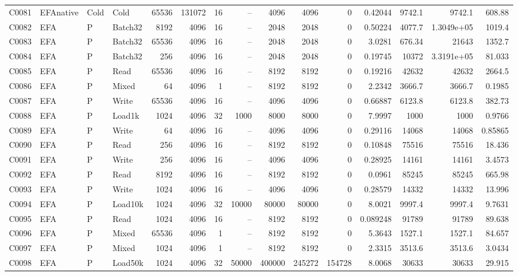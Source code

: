 \begin{landscape}
\begin{longtable}{llllrrrrrrrrrrr}
C0081 & EFAnative & Cold & Cold & 65536 & 131072 & 16 & -- & 4096 & 4096 & 0 & 0.42044 & 9742.1 & 9742.1 & 608.88\\
C0082 & EFA & P & Batch32 & 8192 & 4096 & 16 & -- & 2048 & 2048 & 0 & 0.50224 & 4077.7 & 1.3049e+05 & 1019.4\\
C0083 & EFA & P & Batch32 & 65536 & 4096 & 16 & -- & 2048 & 2048 & 0 & 3.0281 & 676.34 & 21643 & 1352.7\\
C0084 & EFA & P & Batch32 & 256 & 4096 & 16 & -- & 2048 & 2048 & 0 & 0.19745 & 10372 & 3.3191e+05 & 81.033\\
C0085 & EFA & P & Read & 65536 & 4096 & 16 & -- & 8192 & 8192 & 0 & 0.19216 & 42632 & 42632 & 2664.5\\
C0086 & EFA & P & Mixed & 64 & 4096 & 1 & -- & 8192 & 8192 & 0 & 2.2342 & 3666.7 & 3666.7 & 0.1985\\
C0087 & EFA & P & Write & 65536 & 4096 & 16 & -- & 4096 & 4096 & 0 & 0.66887 & 6123.8 & 6123.8 & 382.73\\
C0088 & EFA & P & Load1k & 1024 & 4096 & 32 & 1000 & 8000 & 8000 & 0 & 7.9997 & 1000 & 1000 & 0.9766\\
C0089 & EFA & P & Write & 64 & 4096 & 16 & -- & 4096 & 4096 & 0 & 0.29116 & 14068 & 14068 & 0.85865\\
C0090 & EFA & P & Read & 256 & 4096 & 16 & -- & 8192 & 8192 & 0 & 0.10848 & 75516 & 75516 & 18.436\\
C0091 & EFA & P & Write & 256 & 4096 & 16 & -- & 4096 & 4096 & 0 & 0.28925 & 14161 & 14161 & 3.4573\\
C0092 & EFA & P & Read & 8192 & 4096 & 16 & -- & 8192 & 8192 & 0 & 0.0961 & 85245 & 85245 & 665.98\\
C0093 & EFA & P & Write & 1024 & 4096 & 16 & -- & 4096 & 4096 & 0 & 0.28579 & 14332 & 14332 & 13.996\\
C0094 & EFA & P & Load10k & 1024 & 4096 & 32 & 10000 & 80000 & 80000 & 0 & 8.0021 & 9997.4 & 9997.4 & 9.7631\\
C0095 & EFA & P & Read & 1024 & 4096 & 16 & -- & 8192 & 8192 & 0 & 0.089248 & 91789 & 91789 & 89.638\\
C0096 & EFA & P & Mixed & 65536 & 4096 & 1 & -- & 8192 & 8192 & 0 & 5.3643 & 1527.1 & 1527.1 & 84.657\\
C0097 & EFA & P & Mixed & 1024 & 4096 & 1 & -- & 8192 & 8192 & 0 & 2.3315 & 3513.6 & 3513.6 & 3.0434\\
C0098 & EFA & P & Load50k & 1024 & 4096 & 32 & 50000 & 400000 & 245272 & 154728 & 8.0068 & 30633 & 30633 & 29.915\\

\end{longtable}
\end{landscape}
